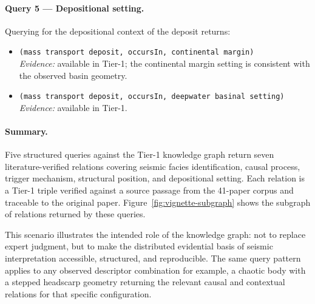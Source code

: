 \documentclass[10pt]{article}
\begin{document}
\paragraph{Query 5 — Depositional setting.}
Querying for the depositional context of the deposit
returns:

\begin{itemize}
  \item \texttt{(mass transport deposit, occursIn,
  continental margin)}\\
  \textit{Evidence:} available in Tier-1; the
  continental margin setting is consistent with
  the observed basin geometry.

  \item \texttt{(mass transport deposit, occursIn,
  deepwater basinal setting)}\\
  \textit{Evidence:} available in Tier-1.
\end{itemize}

\paragraph{Summary.}
Five structured queries against the Tier-1 knowledge
graph return seven literature-verified relations
covering seismic facies identification, causal
process, trigger mechanism, structural position, and
depositional setting.
Each relation is a Tier-1 triple verified against a
source passage from the 41-paper corpus and
traceable to the original paper.
Figure~\ref{fig:vignette-subgraph} shows the
subgraph of relations returned by these queries.

This scenario illustrates the intended role of the
knowledge graph: not to replace expert judgment,
but to make the distributed evidential basis of
seismic interpretation accessible, structured, and
reproducible.
The same query pattern applies to any observed
descriptor combination  for example, a chaotic
body with a stepped headscarp geometry  returning
the relevant causal and contextual relations for
that specific configuration.
\end{document}
